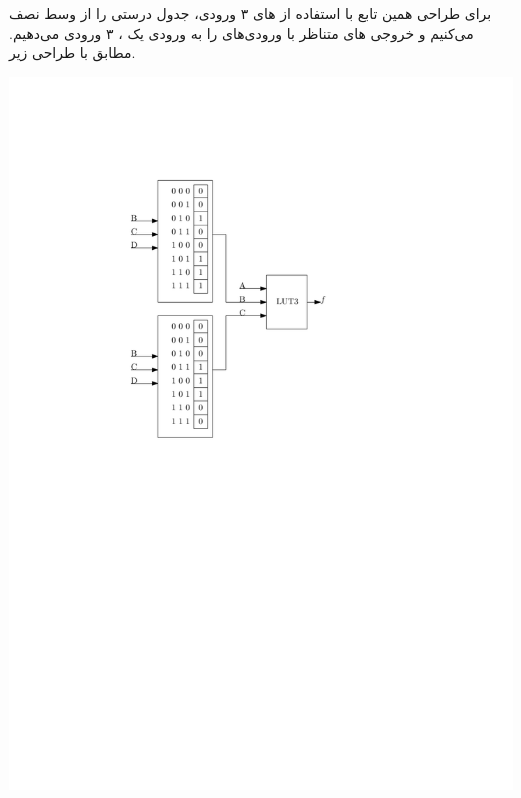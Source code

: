 \begin{qsolve}
	برای طراحی همین تابع با استفاده از  های ۳ ورودی، جدول درستی را از وسط نصف می‌کنیم و خروجی های متناظر با ورودی‌های  را به ورودی یک ، ۳ ورودی می‌دهیم. مطابق با طراحی زیر.
	
	\begin{center}
		\includegraphics*[width=0.42\linewidth]{pics/Q3_b.pdf}
	\end{center}
	
		
	
\end{qsolve}